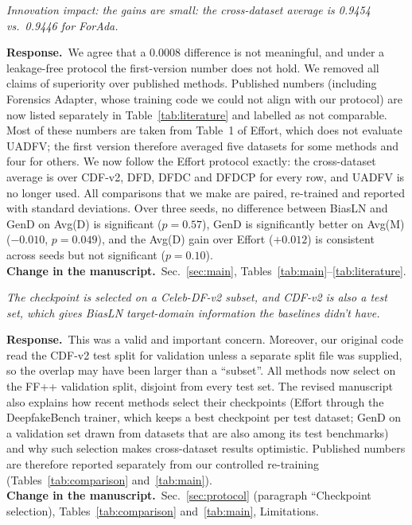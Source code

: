 \documentclass[11pt]{article}
\newenvironment{comment}{\par\medskip\noindent\begin{minipage}{\linewidth}\color{black!70}\itshape}{\end{minipage}\par\smallskip}
\newcommand{\resp}{\noindent\textbf{Response.}~}
\newcommand{\change}{\noindent\textbf{Change in the manuscript.}~}
\begin{document}
\begin{comment}
Innovation impact: the gains are small: the cross-dataset average is 0.9454 vs.\ 0.9446 for ForAda.
\end{comment}
\resp We agree that a 0.0008 difference is not meaningful, and under a leakage-free protocol the first-version number does not hold. We removed all claims of superiority over published methods. Published numbers (including Forensics Adapter, whose training code we could not align with our protocol) are now listed separately in Table~\ref{tab:literature} and labelled as not comparable. Most of these numbers are taken from Table~1 of Effort, which does not evaluate UADFV; the first version therefore averaged five datasets for some methods and four for others. We now follow the Effort protocol exactly: the cross-dataset average is over CDF-v2, DFD, DFDC and DFDCP for every row, and UADFV is no longer used. All comparisons that we make are paired, re-trained and reported with standard deviations. Over three seeds, no difference between BiasLN and GenD on Avg(D) is significant ($p=0.57$), GenD is significantly better on Avg(M) ($-0.010$, $p=0.049$), and the Avg(D) gain over Effort ($+0.012$) is consistent across seeds but not significant ($p=0.10$).\\
\change Sec.~\ref{sec:main}, Tables~\ref{tab:main}--\ref{tab:literature}.

\begin{comment}
The checkpoint is selected on a Celeb-DF-v2 subset, and CDF-v2 is also a test set, which gives BiasLN target-domain information the baselines didn't have.
\end{comment}
\resp This was a valid and important concern. Moreover, our original code read the CDF-v2 test split for validation unless a separate split file was supplied, so the overlap may have been larger than a ``subset''. All methods now select on the FF++ validation split, disjoint from every test set. The revised manuscript also explains how recent methods select their checkpoints (Effort through the DeepfakeBench trainer, which keeps a best checkpoint per test dataset; GenD on a validation set drawn from datasets that are also among its test benchmarks) and why such selection makes cross-dataset results optimistic. Published numbers are therefore reported separately from our controlled re-training (Tables~\ref{tab:comparison} and~\ref{tab:main}).\\
\change Sec.~\ref{sec:protocol} (paragraph ``Checkpoint selection), Tables~\ref{tab:comparison} and~\ref{tab:main}, Limitations.
\end{document}
